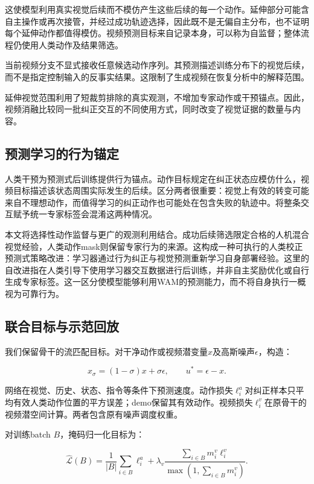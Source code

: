 \documentclass[letterpaper,10pt,conference]{ieeeconf}
\begin{document}
这使模型利用真实视觉后续而不模仿产生这些后续的每一个动作。延伸部分可能含自主操作或再次接管，并经过成功轨迹选择，因此既不是无偏自主分布，也不证明每个延伸动作都值得模仿。视频预测目标来自记录本身，可以称为自监督；整体流程仍使用人类动作及结果筛选。

当前视频分支不显式接收任意候选动作序列。其预测描述训练分布下的视觉后续，而不是指定控制输入的反事实结果。这限制了生成视频在恢复分析中的解释范围。

延伸视觉范围利用了短裁剪排除的真实观测，不增加专家动作或干预锚点。因此，视频消融比较同一批纠正交互的不同使用方式，同时改变了视觉证据的数量与内容。

\subsection{预测学习的行为锚定}
人类干预为预测式后训练提供行为锚点。动作目标规定在纠正状态应模仿什么，视频目标描述该状态周围实际发生的后续。区分两者很重要：视觉上有效的转变可能来自不理想动作，而值得学习的纠正动作也可能处在包含失败的轨迹中。将整条交互赋予统一专家标签会混淆这两种情况。

本文将选择性动作监督与更广的观测利用结合。成功后续筛选限定合格的人机混合视觉经验，人类动作mask则保留专家行为的来源。这构成一种可执行的人类校正预测式策略改进：学习器通过行为纠正与视觉预测重新学习自身部署经验。这里的自改进指在人类引导下使用学习器交互数据进行后训练，并非自主奖励优化或自行生成专家标签。这一区分使模型能够利用WAM的预测能力，而不将自身执行一概视为可靠行为。

\subsection{联合目标与示范回放}

我们保留骨干的流匹配\cite{flow}目标。对干净动作或视频潜变量$x$及高斯噪声$\epsilon$，构造：

\begin{equation}
x_\sigma=(1-\sigma)x+\sigma\epsilon,\qquad
u^*=\epsilon-x.
\end{equation}

网络在视觉、历史、状态、指令等条件下预测速度。动作损失$\ell_i^a$对纠正样本只平均有效人类动作位置的平方误差；demo保留其有效动作。视频损失$\ell_i^v$在原骨干的视频潜空间计算。两者包含原有噪声调度权重。

对训练batch $B$，掩码归一化目标为：

\begin{equation}
\widehat{\mathcal L}(B)=
\frac{1}{|B|}\sum_{i\in B}\ell_i^a+
\lambda_v\frac{\sum_{i\in B}m_i^v\ell_i^v}
{\max(1,\sum_{i\in B}m_i^v)}.
\end{equation}
\end{document}
